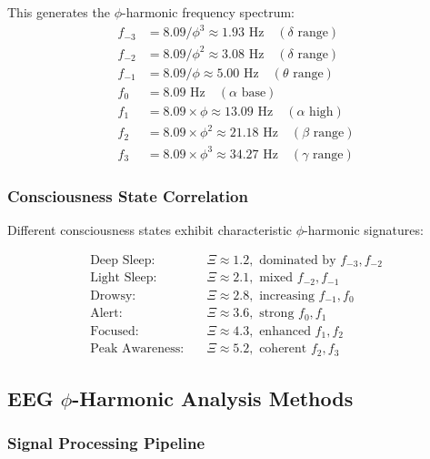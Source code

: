 This generates the $\phi$-harmonic frequency spectrum:
\begin{align}
f_{-3} &= 8.09 / \phi^3 \approx 1.93 \text{ Hz} \quad (\delta \text{ range})\\
f_{-2} &= 8.09 / \phi^2 \approx 3.08 \text{ Hz} \quad (\delta \text{ range})\\
f_{-1} &= 8.09 / \phi \approx 5.00 \text{ Hz} \quad (\theta \text{ range})\\
f_0 &= 8.09 \text{ Hz} \quad (\alpha \text{ base})\\
f_1 &= 8.09 \times \phi \approx 13.09 \text{ Hz} \quad (\alpha \text{ high})\\
f_2 &= 8.09 \times \phi^2 \approx 21.18 \text{ Hz} \quad (\beta \text{ range})\\
f_3 &= 8.09 \times \phi^3 \approx 34.27 \text{ Hz} \quad (\gamma \text{ range})
\end{align}

\subsubsection{Consciousness State Correlation}

Different consciousness states exhibit characteristic $\phi$-harmonic signatures:

\begin{align}
\text{Deep Sleep:} &\quad \Xi \approx 1.2, \text{ dominated by } f_{-3}, f_{-2}\\
\text{Light Sleep:} &\quad \Xi \approx 2.1, \text{ mixed } f_{-2}, f_{-1}\\
\text{Drowsy:} &\quad \Xi \approx 2.8, \text{ increasing } f_{-1}, f_0\\
\text{Alert:} &\quad \Xi \approx 3.6, \text{ strong } f_0, f_1\\
\text{Focused:} &\quad \Xi \approx 4.3, \text{ enhanced } f_1, f_2\\
\text{Peak Awareness:} &\quad \Xi \approx 5.2, \text{ coherent } f_2, f_3
\end{align}

\subsection{EEG $\phi$-Harmonic Analysis Methods}

\subsubsection{Signal Processing Pipeline}

